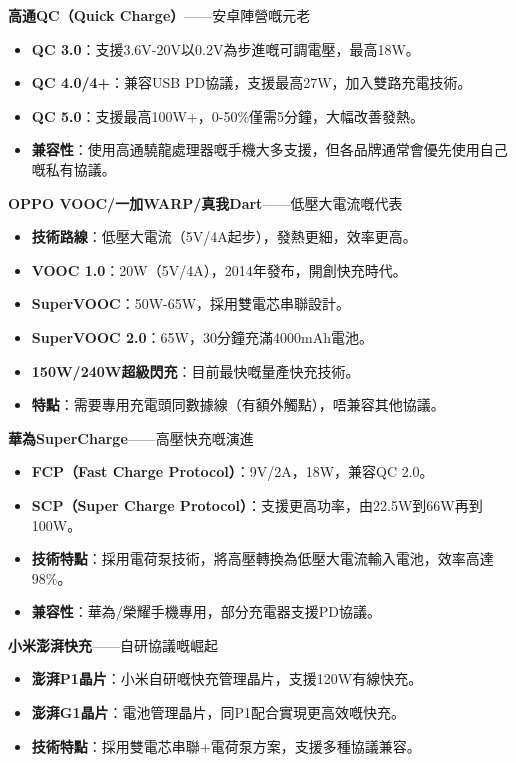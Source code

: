 \textbf{高通QC（Quick Charge）}——安卓陣營嘅元老

\begin{itemize}
  \item \textbf{QC 3.0}：支援3.6V-20V以0.2V為步進嘅可調電壓，最高18W。
  \item \textbf{QC 4.0/4+}：兼容USB PD協議，支援最高27W，加入雙路充電技術。
  \item \textbf{QC 5.0}：支援最高100W+，0-50\%僅需5分鐘，大幅改善發熱。
  \item \textbf{兼容性}：使用高通驍龍處理器嘅手機大多支援，但各品牌通常會優先使用自己嘅私有協議。
\end{itemize}

\textbf{OPPO VOOC/一加WARP/真我Dart}——低壓大電流嘅代表

\begin{itemize}
  \item \textbf{技術路線}：低壓大電流（5V/4A起步），發熱更細，效率更高。
  \item \textbf{VOOC 1.0}：20W（5V/4A），2014年發布，開創快充時代。
  \item \textbf{SuperVOOC}：50W-65W，採用雙電芯串聯設計。
  \item \textbf{SuperVOOC 2.0}：65W，30分鐘充滿4000mAh電池。
  \item \textbf{150W/240W超級閃充}：目前最快嘅量產快充技術。
  \item \textbf{特點}：需要專用充電頭同數據線（有額外觸點），唔兼容其他協議。
\end{itemize}

\textbf{華為SuperCharge}——高壓快充嘅演進

\begin{itemize}
  \item \textbf{FCP（Fast Charge Protocol）}：9V/2A，18W，兼容QC 2.0。
  \item \textbf{SCP（Super Charge Protocol）}：支援更高功率，由22.5W到66W再到100W。
  \item \textbf{技術特點}：採用電荷泵技術，將高壓轉換為低壓大電流輸入電池，效率高達98\%。
  \item \textbf{兼容性}：華為/榮耀手機專用，部分充電器支援PD協議。
\end{itemize}

\textbf{小米澎湃快充}——自研協議嘅崛起

\begin{itemize}
  \item \textbf{澎湃P1晶片}：小米自研嘅快充管理晶片，支援120W有線快充。
  \item \textbf{澎湃G1晶片}：電池管理晶片，同P1配合實現更高效嘅快充。
  \item \textbf{技術特點}：採用雙電芯串聯+電荷泵方案，支援多種協議兼容。
\end{itemize}


